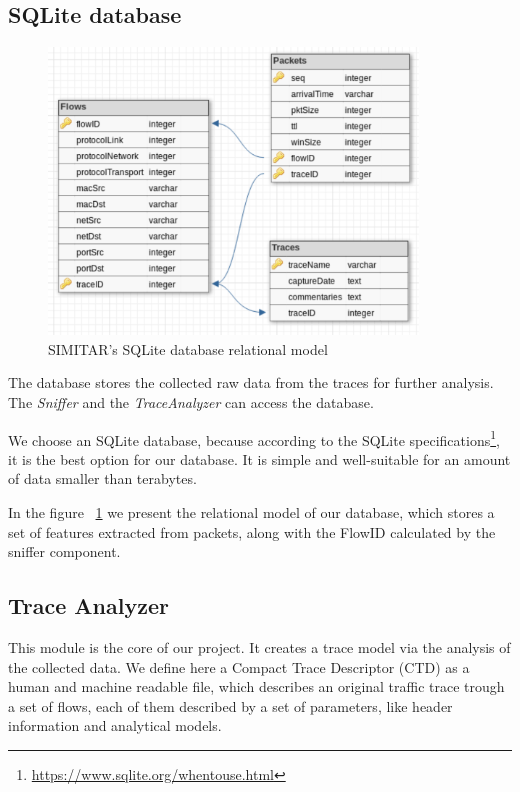 \subsection{SQLite database}

\begin{figure}[ht!]
        \centering
        \includegraphics[height=3.0in]{figures/ch3/database-relational-model}
        \caption{SIMITAR's SQLite database relational model}
    \label{fig:simitar-database}
\end{figure}


The database stores the collected raw data  from the traces for further analysis. The \textit{Sniffer} and the \textit{TraceAnalyzer} can access the database. 


We choose an SQLite database, because according to the SQLite specifications\footnote{\href{https://www.sqlite.org/whentouse.html}{https://www.sqlite.org/whentouse.html}}, it is the best option for our database. It is simple and well-suitable for an amount of data smaller than terabytes.


In the figure ~\ref{fig:simitar-database} we present the relational model of our database, which stores a set of features extracted from packets, along with the FlowID calculated by the sniffer component. 

\subsection{Trace Analyzer}


This module is the core of our project. It creates a trace model via the analysis of the collected data. We define here a Compact Trace Descriptor (CTD) as a human and machine readable file, which describes an original traffic trace trough a set of flows, each of them described by a set of parameters, like header information and analytical models. 


